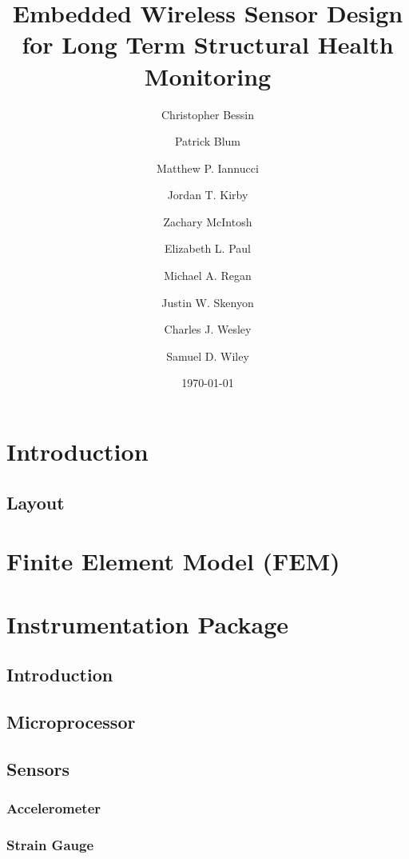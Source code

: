 \documentclass[12pt]{report}
\title{\vspace{-5mm}
	\fontsize{20pt}{10pt}\selectfont
	Embedded Wireless Sensor Design for Long Term Structural Health Monitoring
}
\author[2]{Christopher Bessin}
\author[1]{Patrick Blum}
\author[1]{Matthew P. Iannucci}
\author[1]{Jordan T. Kirby}
\author[1]{Zachary McIntosh}
\author[2]{Elizabeth L. Paul}
\author[1]{Michael A. Regan}
\author[2]{Justin W. Skenyon}
\author[1]{Charles J. Wesley}
\author[1]{Samuel D. Wiley}
\affil[1]{Finite Element Modelling}
\affil[2]{Instrumentation Development}
\date{\normalsize\vspace{-3mm}\today}
\begin{document}
\maketitle


%

\begin{abstract}

\end{abstract}

\tableofcontents
\listoffigures
\listoftables

\chapter{Introduction}
\label{ch:Paper_Introduction}
		
	\section{Layout}
		
		
\chapter{Finite Element Model (FEM)}
\label{ch:FEM}
	

\chapter{Instrumentation Package}
\label{ch:Instrumentation}
	\section{Introduction}
		
	\section{Microprocessor}
		\label{sec:uProcessor}
		
	\section{Sensors}
		\subsection{Accelerometer}
			
		\subsection{Strain Gauge}
			
\end{document}
